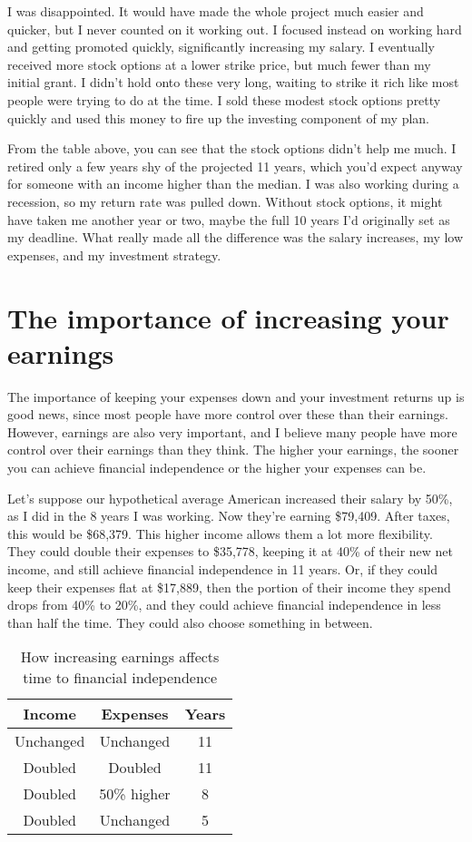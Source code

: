 I was disappointed. It would have made the whole project much easier and quicker, but I never counted on it working out. I focused instead on working hard and getting promoted quickly, significantly increasing my salary. I eventually received more stock options at a lower strike price, but much fewer than my initial grant. I didn't hold onto these very long, waiting to strike it rich like most people were trying to do at the time. I sold these modest stock options pretty quickly and used this money to fire up the investing component of my plan.

From the table above, you can see that the stock options didn't help me much. I retired only a few years shy of the projected 11 years, which you'd expect anyway for someone with an income higher than the median. I was also working during a recession, so my return rate was pulled down. Without stock options, it might have taken me another year or two, maybe the full 10 years I'd originally set as my deadline. What really made all the difference was the salary increases, my low expenses, and my investment strategy.

\section{The importance of increasing your earnings}
The importance of keeping your expenses down and your investment returns up is good news, since most people have more control over these than their earnings. However, earnings are also very important, and I believe many people have more control over their earnings than they think. The higher your earnings, the sooner you can achieve financial independence or the higher your expenses can be.

Let's suppose our hypothetical average American increased their salary by 50\%, as I did in the 8 years I was working. Now they're earning \$79,409. After taxes, this would be \$68,379. This higher income allows them a lot more flexibility. They could double their expenses to \$35,778, keeping it at 40\% of their new net income, and still achieve financial independence in 11 years. Or, if they could keep their expenses flat at \$17,889, then the portion of their income they spend drops from 40\% to 20\%, and they could achieve financial independence in less than half the time. They could also choose something in between.

\begin{table}[ht]
\caption{How increasing earnings affects time to financial independence}
\centering
\begin{tabular}{c c c}
\hline\hline
Income & Expenses & Years \\
\hline
Unchanged & Unchanged & 11 \\
Doubled & Doubled & 11 \\
Doubled & 50\% higher & 8 \\
Doubled & Unchanged & 5 \\
\hline
\end{tabular}
\end{table}

